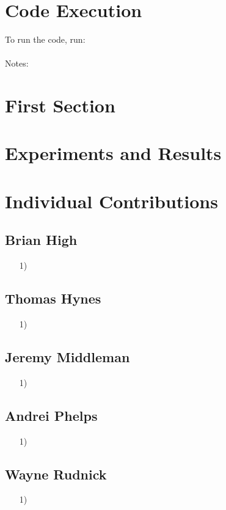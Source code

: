 \documentclass{article}
\begin{document}
\section*{Code Execution}

To run the code, run: \\ \\
Notes: 

\section*{First Section}

\section*{Experiments and Results}

\section*{Individual Contributions}

\subsection*{Brian High}
\begin{itemize}
    \item[1)] 
\end{itemize}

\subsection*{Thomas Hynes}
\begin{itemize}
    \item[1)] 
\end{itemize}

\subsection*{Jeremy Middleman}
\begin{itemize}
    \item[1)] 
\end{itemize}

\subsection*{Andrei Phelps}
\begin{itemize}
    \item[1)] 
\end{itemize}

\subsection*{Wayne Rudnick}
\begin{itemize}
    \item[1)] 
\end{itemize}
\end{document}

